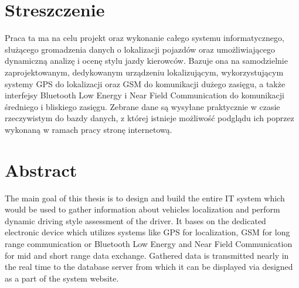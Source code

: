 \chapter*{Streszczenie}

Praca ta ma na celu projekt oraz wykonanie całego systemu informatycznego, służącego gromadzenia danych o lokalizacji pojazdów oraz umożliwiającego dynamiczną analizę i ocenę stylu jazdy kierowców. Bazuje ona na samodzielnie zaprojektowanym, dedykowanym urządzeniu lokalizującym, wykorzystującym systemy GPS do lokalizacji oraz GSM do komunikacji dużego zasięgu, a także interfejsy Bluetooth Low Energy i Near Field Communication do komunikacji średniego i bliskiego zasięgu. Zebrane dane są wysyłane praktycznie w czasie rzeczywistym do bazdy danych, z której istnieje możliwość podglądu ich poprzez wykonaną w ramach pracy stronę internetową.

\chapter*{Abstract}

The main goal of this thesis is to design and build the entire IT system which would be used to gather information about vehicles localization and perform dynamic driving style assessment of the driver. It bases on the dedicated electronic device which utilizes systems like GPS for localization, GSM for long range communication or Bluetooth Low Energy and Near Field Communication for mid and short range data exchange. Gathered data is transmitted nearly in the real time to the database server from which it can be displayed via designed as a part of the system website.